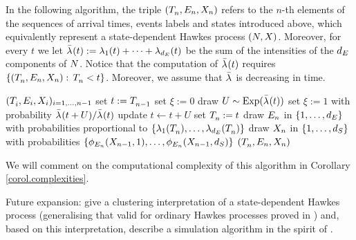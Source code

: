 \documentclass[10pt, article,table]{article}
\begin{document}
In the following algorithm, the triple $(\arrivalTimes[]_n,\event[n],\stateVariable_n)$ refers to the $n$-th elements of the sequences of arrival times, events labels and states introduced above, which equivalently represent a state-dependent Hawkes process $(\multiCountingProc, \stateVariable)$. Moreover, for every $t$ we let $\bar{\intensity[]}(t):= \intensity[1](t) + \dots + \intensity[\numEventTypes](t)$ be the sum of the intensities of the $\numEventTypes$ components of $\multiCountingProc$. Notice that the computation of $\bar{\intensity[]}(t)$ requires $\lbrace(\arrivalTimes[]_n,\event[n],\stateVariable_n): \, \arrivalTimes[]_n <t\rbrace$. Moreover, we assume that $\bar{\intensity[]}$ is decreasing in time. 
\begin{algorithm}
 \caption{{\citealp[Algorithm 2.4]{MP18sta}}}
 \label{algo.MP18_ogata}
 \begin{algorithmic}[5]
  \REQUIRE $(\arrivalTimes[]_i, \event[i], \stateVariable_i)_{i=1,\dots,n-1}$
  \STATE set $t:=\arrivalTimes[]_{n-1}$
  \STATE set $\xi:=0$
  \STATE draw $U \sim \text{Exp}(\bar{\intensity[]}(t))$
  \STATE set $\xi :=1$ with probability $\bar{\intensity[]}(t+U)/\bar{\intensity[]}(t)$
  \STATE update $t\leftarrow t+U$
  \ENDWHILE
  \STATE set $\arrivalTimes[]_n:=t$
  \STATE draw $\event[n]$ in $\lbrace 1,\dots,\numEventTypes\rbrace$ with probabilities proportional to $\lbrace \intensity[1](\arrivalTimes[]_n), \dots, \intensity[\numEventTypes](\arrivalTimes[]_n)\rbrace$
  \STATE draw $\stateVariable_n$ in $\lbrace 1,\dots,\numStates\rbrace$ with probabilities $\lbrace \transProb_{\event}(\stateVariable_{n-1},1), \dots,\transProb_{\event}(\stateVariable_{n-1},\numStates)\rbrace$
  \RETURN $(\arrivalTimes[]_n,\event[n],\stateVariable_n)$
 \end{algorithmic}
\end{algorithm}

We will comment on the computational complexity of this algorithm in Corollary \ref{corol.complexities}. 


Future expansion: give a clustering interpretation of a state-dependent Hawkes process (generalising that valid for ordinary Hawkes processes proved in \citealp{HO74clu}) and, based on this interpretation, describe a simulation algorithm in the spirit of \citealp{MR05per}.
\end{document}
